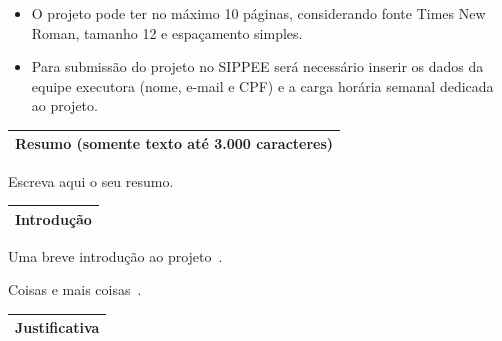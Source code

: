 \documentclass[
  12pt,				
  openright,	
  twoside,	
  a4paper,
  brazil,	
  oldfontcommands,
  ]{abntex2}
\begin{document}
{\footnotesize
\begin{itemize}[noitemsep]
    \item O projeto pode ter no m\'{a}ximo 10 p\'{a}ginas, considerando fonte Times New Roman, tamanho 12 e espa\c{c}amento simples.

    \item Para submiss\~{a}o do projeto no SIPPEE ser\'{a} necess\'{a}rio inserir os dados da equipe executora (nome, e-mail e CPF) e a carga hor\'{a}ria semanal dedicada ao projeto.
\end{itemize}
}

\vspace{-5mm}

\begin{table}[H]
\begin{center}
\begin{tabularx}{\textwidth}{|X|}
\hline
{\bf Resumo} {\tiny (somente texto at\'{e} 3.000 caracteres)}\\\hline
\end{tabularx}
\end{center}
\end{table}
\vspace{-10mm}

Escreva aqui o seu resumo.

\begin{table}[H]
\begin{center}
\begin{tabularx}{\textwidth}{|X|}
\hline
{\bf Introdu\c{c}\~{a}o}\\\hline
\end{tabularx}
\end{center}
\end{table}
\vspace{-10mm}

Uma breve introdução ao projeto~\cite{welive2016tbs,newman2017tbc}. 

Coisas e mais coisas~\cite{pwc2014ucc,kerr2010stuxnet,langner2011stuxnet,islam2016classification,shu2016security}.


\begin{table}[H]
\begin{center}
\begin{tabularx}{\textwidth}{|X|}
\hline
{\bf Justificativa} \\\hline
\end{tabularx}
\end{center}
\end{table}
\vspace{-10mm}
\end{document}
